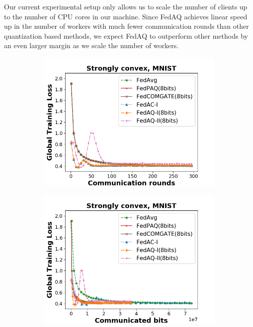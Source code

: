 \begin{remark}
Our current experimental setup only allows us to scale the number of clients up to the number of CPU cores in our machine. Since FedAQ achieves linear speed up in the number of workers with much fewer communication rounds than other quantization based methods, we expect FedAQ to outperform other methods by an even larger margin as we scale the number of workers.
\end{remark}

\begin{figure}[!htbp] 
    \centering
    \begin{subfigure}[b]{0.31\textwidth}
    \includegraphics[width=\textwidth]{figure/loss_iid_comm_str_cvx.png}
    \end{subfigure}
    \begin{subfigure}[b]{0.31\textwidth}
    \includegraphics[width=\textwidth]{figure/loss_iid_bits_str_cvx.png}

\end{subfigure}
\end{figure}
